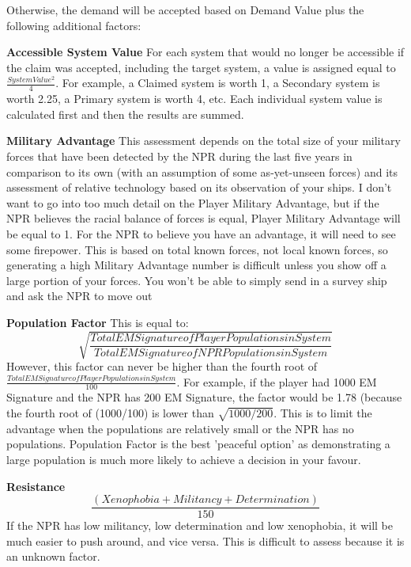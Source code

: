 \documentclass[10pt,a4paper,oneside]{article}
\begin{document}
Otherwise, the demand will be accepted based on Demand Value plus the following additional factors:

\textbf{Accessible System Value}\newline
For each system that would no longer be accessible if the claim was accepted, including the target system, a value is assigned equal to \( \frac{System Value^{2}}{4} \). For example, a Claimed system is worth 1, a Secondary system is worth 2.25, a Primary system is worth 4, etc. Each individual system value is calculated first and then the results are summed.

\textbf{Military Advantage}\newline
This assessment depends on the total size of your military forces that have been detected by the NPR during the last five years in comparison to its own (with an assumption of some as-yet-unseen forces) and its assessment of relative technology based on its observation of your ships. I don't want to go into too much detail on the Player Military Advantage, but if the NPR believes the racial balance of forces is equal, Player Military Advantage will be equal to 1. For the NPR to believe you have an advantage, it will need to see some firepower. This is based on total known forces, not local known forces, so generating a high Military Advantage number is difficult unless you show off a large portion of your forces. You won't be able to simply send in a survey ship and ask the NPR to move out

\textbf{Population Factor}\newline
This is equal to:
\[ \sqrt{\frac{Total EM Signature of Player Populations in System}{Total EM Signature of NPR Populations in System}} \]
However, this factor can never be higher than the fourth root of \( \frac{Total EM Signature of Player Populations in System}{100} \). For example, if the player had 1000 EM Signature and the NPR has 200 EM Signature, the factor would be 1.78 (because the fourth root of (1000/100) is lower than \( \sqrt{1000 / 200} \). This is to limit the advantage when the populations are relatively small or the NPR has no populations. Population Factor is the best ’peaceful option’ as demonstrating a large population is much more likely to achieve a decision in your favour.

\textbf{Resistance}\newline
\[ \frac{(Xenophobia + Militancy + Determination)}{150} \]
If the NPR has low militancy, low determination and low xenophobia, it will be much easier to push around, and vice versa. This is difficult to assess because it is an unknown factor.
\end{document}
